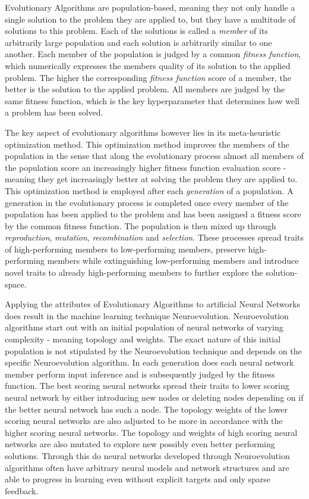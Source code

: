 \documentclass[journal, a4paper]{IEEEtran}
\begin{document}
Evolutionary Algorithms are population-based, meaning they not only handle a single solution to the problem they are applied to, but they have a multitude of solutions to this problem. Each of the solutions is called a \textit{member} of its arbitrarily large population and each solution is arbitrarily similar to one another. Each member of the population is judged by a common \textit{fitness function}, which numerically expresses the members quality of its solution to the applied problem. The higher the corresponding \textit{fitness function} score of a member, the better is the solution to the applied problem. All members are judged by the same fitness function, which is the key hyperparameter that determines how well a problem has been solved.

The key aspect of evolutionary algorithms however lies in its meta-heuristic optimization method. This optimization method improves the members of the population in the sense that along the evolutionary process almost all members of the population score an increasingly higher fitness function evaluation score - meaning they get increasingly better at solving the problem they are applied to.
This optimization method is employed after each \textit{generation} of a population. A generation in the evolutionary process is completed once every member of the population has been applied to the problem and has been assigned a fitness score by the common fitness function. The population is then mixed up through \textit{reproduction}, \textit{mutation}, \textit{recombination} and \textit{selection}. These processes spread traits of high-performing members to low-performing members, preserve high-performing members while extinguishing low-performing members and introduce novel traits to already high-performing members to further explore the solution-space.

Applying the attributes of Evolutionary Algorithms to artificial Neural Networks does result in the machine learning technique Neuroevolution. Neuroevolution algorithms start out with an initial population of neural networks of varying complexity - meaning topology and weights. The exact nature of this initial population is not stipulated by the Neuroevolution technique and depends on the specific Neuroevolution algorithm. In each generation does each neural network member perform input inference and is subsequently judged by the fitness function. The best scoring neural networks spread their traits to lower scoring neural network by either introducing new nodes or deleting nodes depending on if the better neural network has such a node. The topology weights of the lower scoring neural networks are also adjusted to be more in accordance with the higher scoring neural networks. The topology and weights of high scoring neural networks are also mutated to explore new possibly even better performing solutions.
Through this do neural networks developed through Neuroevolution algorithms often have arbitrary neural models and network structures and are able to progress in learning even without explicit targets and only sparse feedback.
\end{document}
